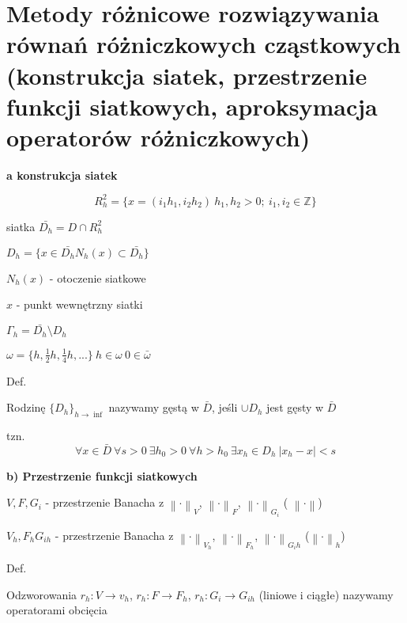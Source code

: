 \section{Metody różnicowe rozwiązywania równań różniczkowych cząstkowych (konstrukcja siatek, przestrzenie funkcji siatkowych, aproksymacja operatorów różniczkowych)}

\textbf{a\) konstrukcja siatek}

\[R^{2}_{h} = \{ x = (i_{1}h_{1}, i_{2}h_{2})\ h_{1},h_{2} > 0;\ i_{1},i_{2} \in \mathbb{Z}\}\]

siatka $\bar{D_{h}} = D \cap R^{2}_{h}$

$D_{h} = \{ x \in \bar{D_{h}} N_h(x) \subset \bar{D_{h}}\}$

$N_h(x)$ - otoczenie siatkowe

$x$ - punkt wewnętrzny siatki

$\Gamma_h = \bar{D_h} \setminus D_h$

$\omega = \{h, \frac{1}{2}h, \frac{1}{4}h, ...\}\ h \in \omega\ 0 \in \bar{\omega}$

Def.

Rodzinę $\{D_h\}_{h \rightarrow \inf}$ nazywamy gęstą w $\bar{D}$, jeśli $\cup D_h$ jest gęsty w $\bar{D}$

tzn.
\[\forall x \in \bar{D}\ \forall s > 0\ \exists h_0 > 0\ \forall h > h_0\ \exists x_h \in D_h\ |x_h - x| < s\]

\textbf{b) Przestrzenie funkcji siatkowych}

$V, F, G_i$ - przestrzenie Banacha z $\left \| \cdot \right \|_V$, $\left \| \cdot \right \|_F$, $\left \| \cdot \right \|_{G_i}$ ( $\left \| \cdot \right \|$)

$V_h, F_h G_{ih}$ - przestrzenie Banacha z $\left \| \cdot \right \|_{V_h}$, $\left \| \cdot \right \|_{F_h}$, $\left \| \cdot \right \|_{G_ih}$ ($\left \| \cdot \right \|_h$)

Def.

Odzworowania $r_h: V \rightarrow v_h$, $r_h: F \rightarrow F_h$, $r_h: G_i \rightarrow G_{ih}$ (liniowe i ciągłe) nazywamy operatorami obcięcia